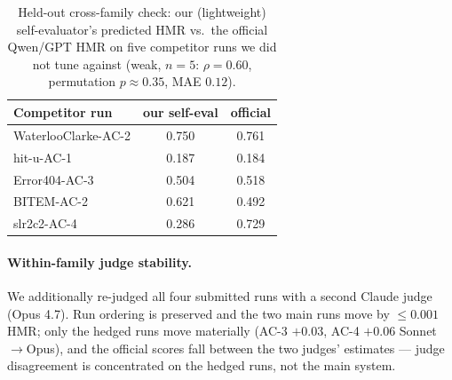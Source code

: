 \documentclass[sigconf,nonacm]{acmart}
\newcommand{\HMR}{\textsc{HMR}}
\begin{document}
\begin{table}[t]
\centering\small
\caption{Held-out cross-family check: our (lightweight) self-evaluator's predicted \HMR{}
vs.\ the official Qwen/GPT \HMR{} on five competitor runs we did not tune against
(weak, $n{=}5$: $\rho{=}0.60$, permutation $p{\approx}0.35$, MAE $0.12$).}
\label{tab:heldout}
\begin{tabular}{lcc}
\toprule
Competitor run & our self-eval & official \\
\midrule
WaterlooClarke-AC-2 & 0.750 & 0.761 \\
hit-u-AC-1          & 0.187 & 0.184 \\
Error404-AC-3       & 0.504 & 0.518 \\
BITEM-AC-2          & 0.621 & 0.492 \\
slr2c2-AC-4         & 0.286 & 0.729 \\
\bottomrule
\end{tabular}
\end{table}

\paragraph{Within-family judge stability.} We additionally re-judged all four submitted runs
with a second Claude judge (Opus 4.7). Run ordering is preserved and the two main runs move
by $\le0.001$ \HMR; only the hedged runs move materially (AC-3 $+0.03$, AC-4 $+0.06$
Sonnet$\to$Opus), and the official scores fall between the two judges' estimates --- judge
disagreement is concentrated on the hedged runs, not the main system.
\end{document}
